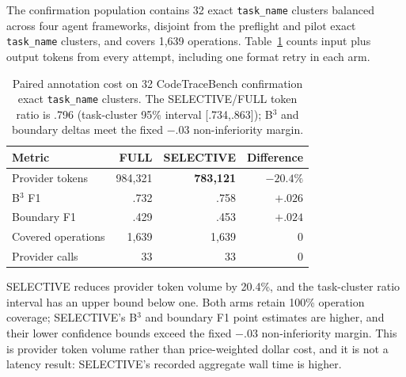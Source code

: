 \documentclass[letterpaper]{article}
\begin{document}
The confirmation population contains 32 exact \texttt{task\_name} clusters
balanced across four agent frameworks, disjoint from the preflight and pilot
exact \texttt{task\_name} clusters, and covers 1{,}639 operations.
Table~\ref{tab:rq4-selective} counts
input plus output tokens from every attempt, including one format retry in
each arm.

\begin{table}[tb]
\centering\small
\setlength{\tabcolsep}{3.5pt}
\begin{tabular}{@{}lrrr@{}}
\toprule
Metric & FULL & SELECTIVE & Difference \\
\midrule
Provider tokens & 984{,}321 & \textbf{783{,}121} & $-20.4\%$ \\
B$^3$ F1 & .732 & .758 & $+.026$ \\
Boundary F1 & .429 & .453 & $+.024$ \\
Covered operations & 1{,}639 & 1{,}639 & 0 \\
Provider calls & 33 & 33 & 0 \\
\bottomrule
\end{tabular}
\caption{Paired annotation cost on 32 CodeTraceBench confirmation exact
\texttt{task\_name} clusters. The SELECTIVE/FULL token ratio is .796
(task-cluster 95\% interval
[.734,.863]); B$^3$ and boundary deltas meet the fixed $-.03$
non-inferiority margin.}
\label{tab:rq4-selective}
\end{table}

SELECTIVE reduces provider token volume by 20.4\%, and the task-cluster ratio
interval has an upper bound below one. Both arms retain 100\% operation coverage;
SELECTIVE's B$^3$ and boundary F1 point estimates are higher, and their
lower confidence bounds exceed the fixed $-.03$ non-inferiority margin.
This is provider token volume rather than price-weighted dollar cost, and it
is not a latency result: SELECTIVE's recorded aggregate wall time is higher.
\end{document}
